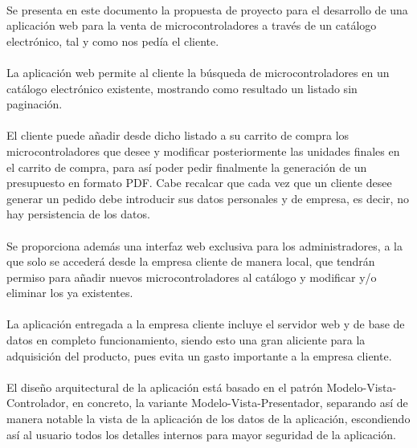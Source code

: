 \paragraph{} Se presenta en este documento la propuesta de proyecto  para el desarrollo de una aplicación web para la venta de microcontroladores a través de un catálogo electrónico, tal y como nos pedía el cliente.
\paragraph{} La aplicación web permite al cliente la búsqueda de microcontroladores en un catálogo electrónico existente, mostrando como resultado un listado sin paginación. 
\paragraph{} El cliente puede añadir desde dicho listado a su carrito de compra los microcontroladores que desee y modificar posteriormente las unidades finales en el carrito de compra, para así poder pedir finalmente la generación de un presupuesto en formato PDF. Cabe recalcar que cada vez que un cliente desee generar un pedido debe introducir sus datos personales y de empresa, es decir, no hay persistencia de los datos.
\paragraph{} Se proporciona además una interfaz web exclusiva para los administradores, a la que solo se accederá desde la empresa cliente de manera local, que tendrán permiso para añadir nuevos microcontroladores al catálogo y modificar y/o eliminar los ya existentes.
\paragraph{} La aplicación entregada a la empresa cliente incluye el servidor web y de base de datos en completo funcionamiento, siendo esto una gran aliciente para la adquisición del producto, pues evita un gasto importante a la empresa cliente. 
\paragraph{} El diseño arquitectural de la aplicación está basado en el patrón Modelo-Vista-Controlador, en concreto, la variante Modelo-Vista-Presentador, separando así de manera notable la vista de la aplicación de los datos de la aplicación, escondiendo así al usuario todos los detalles internos para mayor seguridad de la aplicación.

